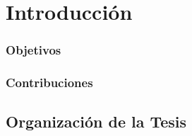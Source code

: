 \chapter*{Introducción}\label{chapter:introduction}

\subsection*{Objetivos}

\subsection*{Contribuciones}

\section*{Organización de la Tesis}

